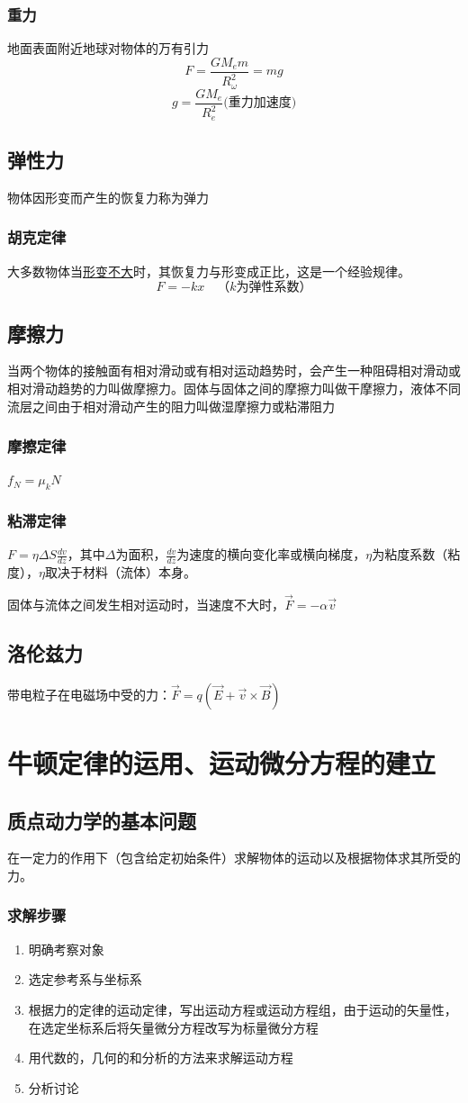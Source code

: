 \subsubsection{重力}地面表面附近地球对物体的万有引力
\[F=\frac{GM_em}{R_\omega^2}=mg\]\[g=\frac{GM_e}{R_e^2}\text{(重力加速度)}\]
\subsection{弹性力}
物体因形变而产生的恢复力称为弹力
\subsubsection{胡克定律}
大多数物体当\underline{形变不大}时，其恢复力与形变成正比，这是一个经验规律。
\[F=-kx\quad\text{（$k$为弹性系数）}\]
\subsection{摩擦力}
当两个物体的接触面有相对滑动或有相对运动趋势时，会产生一种阻碍相对滑动或相对滑动趋势的力叫做摩擦力。固体与固体之间的摩擦力叫做干摩擦力，液体不同流层之间由于相对滑动产生的阻力叫做湿摩擦力或粘滞阻力
\subsubsection{摩擦定律}$f_N=\mu_k N$
\subsubsection{粘滞定律}$F=\eta\varDelta S \frac{dv}{dz}$，其中$\varDelta$为面积，$\frac{dv}{dz}$为速度的横向变化率或横向梯度，$\eta$为粘度系数（粘度），$\eta$取决于材料（流体）本身。

固体与流体之间发生相对运动时，当速度不大时，$\vec{F}=-\alpha\vec{v}$
\subsection{洛伦兹力}
带电粒子在电磁场中受的力：$\vec{F}=q(\vec{E}+\vec{v}\times\vec{B})$
\section{牛顿定律的运用、运动微分方程的建立}
\subsection{质点动力学的基本问题}
在一定力的作用下（包含给定初始条件）求解物体的运动以及根据物体求其所受的力。
\subsubsection{求解步骤}
\begin{enumerate}
\item 明确考察对象
\item 选定参考系与坐标系
\item 根据力的定律的运动定律，写出运动方程或运动方程组，由于运动的矢量性，在选定坐标系后将矢量微分方程改写为标量微分方程
\item 用代数的，几何的和分析的方法来求解运动方程
\item 分析讨论
\end{enumerate}
